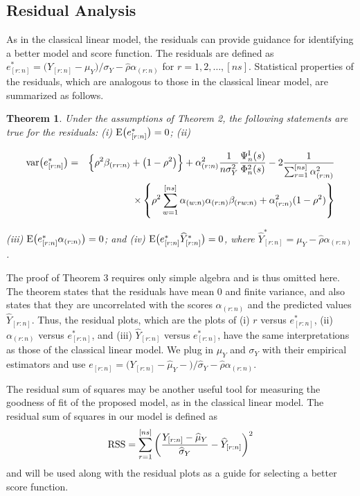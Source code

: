 \documentclass[12pt]{article}
\newtheorem{theorem}{Theorem}
\begin{document}
\subsection{Residual Analysis}

As in the classical linear model, the residuals can provide guidance 
for identifying a better model and score 
function. The residuals are defined as $e_{[r:n]}^* 
= \big(Y_{[r:n]}-\mu_Y\big)/\sigma_Y-\widehat{\rho}\alpha_{(r:n)}$ for 
$r=1,2,\ldots,[ns]$.
Statistical properties of the residuals, which are analogous to those in the classical linear model, 
are summarized as follows.  	
\begin{theorem} Under the assumptions of Theorem 2, the following statements are true for the residuals:
(i) ${\rm E} \big( e_{[r:n]}^* \big)=0$; (ii) \begin{bf}
\begin{eqnarray}
{\rm var} \big( e_{[r:n]}^* \big) &=&\Big\{ \rho^2 \beta_{(rr:n)} + \big( 1 -\rho^2
 \big) \Big\}
+ \alpha_{(r:n)}^2 \frac{1}{n\sigma_Y^2} \frac{\Psi_n^{\rm I}(s)}{\Phi_n^2(s)}
  -2 \frac{1}{\sum_{r=1}^{[ns]}\alpha_{(r:n)}^2} \nonumber\\
&&\times 
\left\{  \rho^2\sum_{w=1}^{[ns]}\alpha_{(w:n)}\alpha_{(r:n)}\beta_{(rw:n)}+\alpha_{(r:n)}^2(1-\rho^2)\right\}\nonumber
\end{eqnarray}  \end{bf} (iii) 
${\rm E} \big( e_{[r:n]}^* \alpha_{(r:n)} \big)=0$; and (iv) ${\rm E} \big( e_{[r:n]}^* \widehat{Y}^*_{[r:n]}
 \big)=0$, 
where $\widehat{Y}^*_{[r:n]}=\mu_Y- \widehat{\rho} \alpha_{(r:n)}$. 
\end{theorem} 
\noindent The proof of Theorem 3 requires only simple algebra and is
thus omitted here. The theorem states 
that the residuals have mean $0$ and finite variance, and also states that they are uncorrelated with 
the scores $\alpha_{(r:n)}$ and the predicted values $\widehat{Y}_{[r:n]}$. Thus, the residual plots, which 
are the plots of (i) $r$ versus $e_{[r:n]}^*$, (ii) $\alpha_{(r:n)}$ versus $e_{[r:n]}^*$, and (iii)
 $\widehat{Y}_{[r:n]}$ versus $e_{[r:n]}^*$, have the same interpretations as those of the 
classical linear model. We plug in $\mu_Y$ and $\sigma_Y$ with their empirical estimators and use 
$e_{[r:n]}=\big(Y_{[r:n]}-\widehat{\mu}_Y-\big)/\widehat{\sigma}_Y-\widehat{\rho} \alpha_{(r:n)}$. 


The residual sum of squares may be another useful tool for measuring the goodness of fit of 
the proposed model, as in the classical linear model. The residual sum of squares in our model is defined
 as 
\begin{equation} \nonumber 
{\rm RSS} = \sum_{r=1}^{[ns]} \bigg(\frac{Y_{[r:n]}-\widehat{\mu}_Y}{\widehat{\sigma}_Y} -\widehat{Y}_{[r:n]} \bigg)^2
\end{equation}
and will be used along with the residual plots as a guide for selecting a better score function. 
\end{document}
